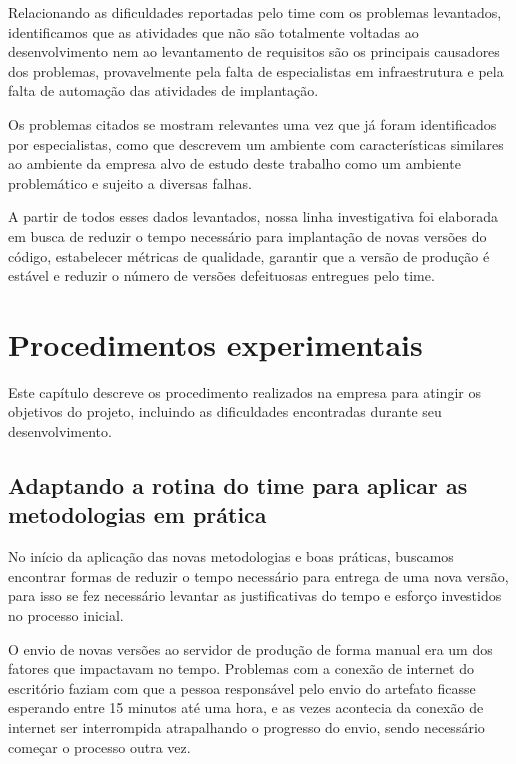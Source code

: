 \documentclass[
	12pt,				%
	openright,			%
	oneside,			%
	a4paper,			%
	english,			%
	french,				%
	spanish,			%
	brazil,				%
	]{abntex2}
\begin{document}
Relacionando as dificuldades reportadas pelo time com os problemas levantados, identificamos que as atividades que não são totalmente voltadas ao desenvolvimento nem ao levantamento de requisitos são os principais causadores dos problemas, provavelmente pela falta de especialistas em infraestrutura e pela falta de automação das atividades de implantação.

Os problemas citados se mostram relevantes uma vez que já foram identificados por especialistas, como  que descrevem um ambiente com características similares ao ambiente da empresa alvo de estudo deste trabalho como um ambiente problemático e sujeito a diversas falhas.

A partir de todos esses dados levantados, nossa linha investigativa foi elaborada em busca de reduzir o tempo necessário para implantação de novas versões do código, estabelecer métricas de qualidade, garantir que a versão de produção é estável e reduzir o número de versões defeituosas entregues pelo time.


\chapter{Procedimentos experimentais}

Este capítulo descreve os procedimento realizados na empresa para atingir os objetivos do projeto, incluindo as dificuldades encontradas durante seu desenvolvimento.

\section{Adaptando a rotina do time para aplicar as metodologias em prática}

No início da aplicação das novas metodologias e boas práticas, buscamos encontrar formas de reduzir o tempo necessário para entrega de uma nova versão, para isso se fez necessário levantar as justificativas do tempo e esforço investidos no processo inicial.

O envio de novas versões ao servidor de produção de forma manual era um dos fatores que impactavam no tempo. Problemas com a conexão de internet do escritório faziam com que a pessoa responsável pelo envio do artefato ficasse esperando entre 15 minutos até uma hora, e as vezes acontecia da conexão de internet ser interrompida atrapalhando o progresso do envio, sendo necessário começar o processo outra vez.
\end{document}
